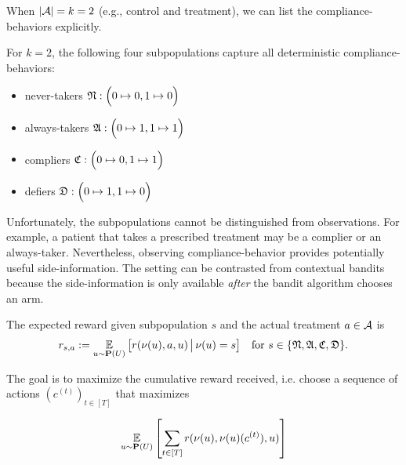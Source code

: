 When $|{\mathcal A}|=k=2$ (e.g., control and treatment), we can list the compliance-behaviors explicitly.
\begin{defn}\label{def:compliance_model}\eod
	For $k=2$, the following four subpopulations capture all deterministic compliance-behaviors:
	\begin{itemize}
		\item never-takers ${\mathfrak N}: \Big(0\mapsto 0, 1\mapsto 0\Big)$
		\item always-takers ${\mathfrak A}: \Big(0\mapsto 1, 1\mapsto 1\Big)$
		\item compliers ${\mathfrak C}: \Big( 0\mapsto 0, 1\mapsto 1\Big)$
		\item defiers ${\mathfrak D}: \Big(0\mapsto 1, 1\mapsto 0\Big)$
	\end{itemize}
\end{defn}

Unfortunately, the subpopulations cannot be distinguished from observations. For example, a patient that takes a prescribed treatment may be a complier or an always-taker. Nevertheless, observing compliance-behavior provides potentially useful side-information. The setting can be contrasted from contextual bandits because the side-information is only available \emph{after} the bandit algorithm chooses an arm.

\begin{defn}\label{def:reward_model}\eod
	The expected reward given subpopulation $s$ and the actual treatment $a\in{\mathcal A}$ is
	\begin{equation}
		r_{s,a} 
		:= \operatorname*{\mathbb E}_{u\sim {\mathbf P}(U)}\big[r(\nu(u),a,u)\,\big|\, \nu(u)=s\big]
		\quad\text{for }s\in \{{\mathfrak N}, {\mathfrak A},{\mathfrak C},{\mathfrak D}\}.
		\label{eq:exp_rew}		
	\end{equation}		
\end{defn}

The goal is to maximize the cumulative reward received, i.e. choose a sequence of actions $(c^{(t)})_{t\in [T]}$ that maximizes 

\begin{equation}
   \operatorname*{\mathbb E}_{u\sim {\mathbf P}(U)}\left[\sum_{t\in[T]}r(\nu(u),\nu(u)(c^{(t)}), u)\right]
\end{equation}

